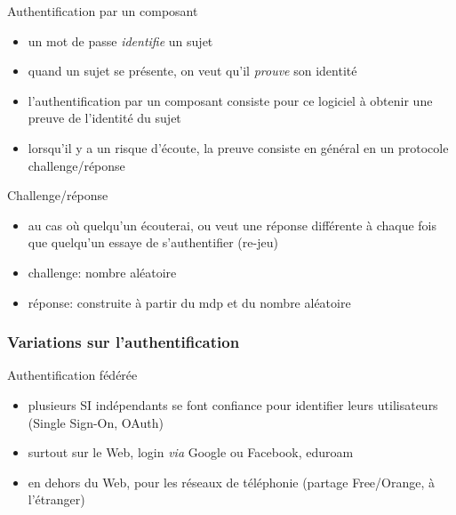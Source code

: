 \begin{reveals}
\begin{frame}
  \begin{block}{Authentification par un composant}
    \begin{itemize}
    \item un mot de passe \emph{identifie} un sujet
    \item quand un sujet se présente, on veut qu'il \emph{prouve} son identité
    \item l'authentification par un composant consiste pour ce
      logiciel à obtenir une preuve de l'identité du sujet
    \item lorsqu'il y a un risque d'écoute, la preuve consiste en
      général en un protocole challenge/réponse
    \end{itemize}
  \end{block}

  \vfill

  \begin{block}{Challenge/réponse}
    \begin{itemize}
    \item au cas où quelqu'un écouterai, ou veut une réponse différente
      à chaque fois que quelqu'un essaye de s'authentifier (re-jeu)
    \item challenge: nombre aléatoire
    \item réponse: construite à partir du mdp et du nombre aléatoire
    \end{itemize}
  \end{block}

  \vfill
  
\end{frame}

\begin{frame}
  \frametitle{Variations sur l'authentification}

  \vfill

  \begin{block}{Authentification fédérée}
    \begin{itemize}
    \item plusieurs SI indépendants se font confiance pour identifier
      leurs utilisateurs (Single Sign-On, OAuth)
    \item surtout sur le Web,  login \textit{via} Google ou Facebook, eduroam
    \item en dehors du Web, pour les réseaux de téléphonie (partage
      Free/Orange, à l'étranger)
    \end{itemize}
  \end{block}
  
  \vfill


\end{frame}
\end{reveals}
